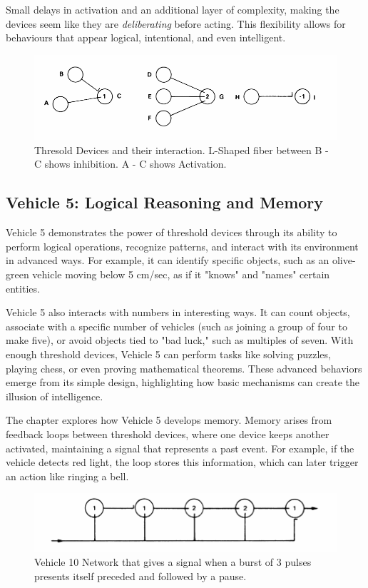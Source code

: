 \documentclass{article}
\begin{document}
    Small delays in activation and an additional layer of complexity, making the devices seem like they are \textit{deliberating} before acting. This flexibility allows for behaviours that appear logical, intentional, and even intelligent.

	\begin{figure}[h]
		\centering
		\includegraphics[scale=0.6]{images/figure_9.png}
		\caption{Thresold Devices and their interaction. L-Shaped fiber between B - C shows inhibition. A - C shows Activation. }
		\label{fig:vehicle-9}
	\end{figure}

    
    \subsection*{Vehicle 5: Logical Reasoning and Memory}
    Vehicle 5 demonstrates the power of threshold devices through its ability to perform logical operations, recognize patterns, and interact with its environment in advanced ways. For example, it can identify specific objects, such as an olive-green vehicle moving below 5 cm/sec, as if it "knows" and "names" certain entities.

    Vehicle 5 also interacts with numbers in interesting ways. It can count objects, associate with a specific number of vehicles (such as joining a group of four to make five), or avoid objects tied to "bad luck," such as multiples of seven. With enough threshold devices, Vehicle 5 can perform tasks like solving puzzles, playing chess, or even proving mathematical theorems. These advanced behaviors emerge from its simple design, highlighting how basic mechanisms can create the illusion of intelligence. 

    The chapter explores how Vehicle 5 develops memory. Memory arises from feedback loops between threshold devices, where one device keeps another activated, maintaining a signal that represents a past event. For example, if the vehicle detects red light, the loop stores this information, which can later trigger an action like ringing a bell. 

	\begin{figure}[h]
		\centering
		\includegraphics[scale=0.6]{images/figure_10a.png}
		\caption{Vehicle 10 Network that gives a signal when a burst of 3 pulses presents itself preceded and followed by a pause.}
		\label{fig:vehicle-10a}
	\end{figure}
\end{document}
